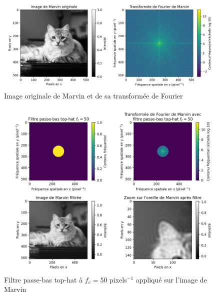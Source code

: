 \documentclass[11pt,letterpaper]{article}
\begin{document}
\begin{figure}[H]
  \centering
  \includegraphics[scale=0.68]{marvin_og.png}
  \caption{Image originale de Marvin et de sa transformée de Fourier}
  \label{cat_og}
\end{figure}

\begin{figure}[H]
  \centering
  \includegraphics[scale=0.7]{marvin_post_filter_fc_50.png}
  \caption{Filtre passe-bas top-hat à $f_c = 50$ pixels$^{-1}$ appliqué sur l'image de Marvin}
  \label{fc50hat}
\end{figure}
\end{document}
